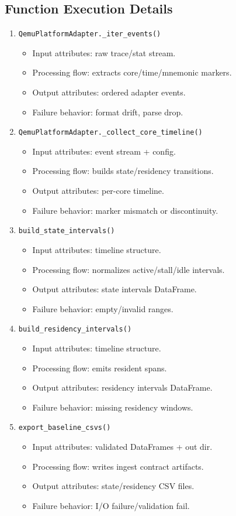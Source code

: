\documentclass[11pt,a4paper]{article}
\begin{document}
\subsection*{Function Execution Details}
\begin{enumerate}[leftmargin=*]
  \item \texttt{QemuPlatformAdapter.\_iter\_events()}
  \begin{itemize}[leftmargin=*]
    \item Input attributes: raw trace/stat stream.
    \item Processing flow: extracts core/time/mnemonic markers.
    \item Output attributes: ordered adapter events.
    \item Failure behavior: format drift, parse drop.
  \end{itemize}
  \item \texttt{QemuPlatformAdapter.\_collect\_core\_timeline()}
  \begin{itemize}[leftmargin=*]
    \item Input attributes: event stream + config.
    \item Processing flow: builds state/residency transitions.
    \item Output attributes: per-core timeline.
    \item Failure behavior: marker mismatch or discontinuity.
  \end{itemize}
  \item \texttt{build\_state\_intervals()}
  \begin{itemize}[leftmargin=*]
    \item Input attributes: timeline structure.
    \item Processing flow: normalizes active/stall/idle intervals.
    \item Output attributes: state intervals DataFrame.
    \item Failure behavior: empty/invalid ranges.
  \end{itemize}
  \item \texttt{build\_residency\_intervals()}
  \begin{itemize}[leftmargin=*]
    \item Input attributes: timeline structure.
    \item Processing flow: emits resident spans.
    \item Output attributes: residency intervals DataFrame.
    \item Failure behavior: missing residency windows.
  \end{itemize}
  \item \texttt{export\_baseline\_csvs()}
  \begin{itemize}[leftmargin=*]
    \item Input attributes: validated DataFrames + out dir.
    \item Processing flow: writes ingest contract artifacts.
    \item Output attributes: state/residency CSV files.
    \item Failure behavior: I/O failure/validation fail.
  \end{itemize}
\end{enumerate}
\end{document}
